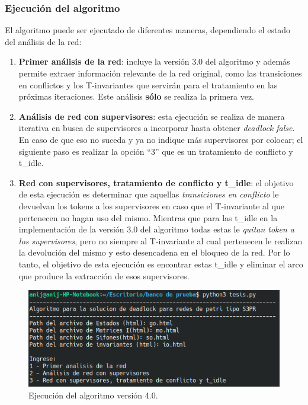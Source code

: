 \subsubsection{Ejecución del algoritmo}
\noindent El algoritmo puede ser ejecutado de diferentes maneras, dependiendo el estado del análisis de la red: 

\begin{enumerate}
    \item \textbf{Primer análisis de la red}: incluye la versión 3.0 del algoritmo y además permite extraer información relevante de la red original, como las transiciones en conflictos y los T-invariantes que servirán para el tratamiento en las próximas iteraciones. Este análisis \textbf{sólo} se realiza la primera vez.
    
    \item \textbf{Análisis de red con supervisores}: esta ejecución se realiza de manera iterativa en busca de supervisores a incorporar hasta obtener \textit{deadlock false}. En caso de que eso no suceda y ya no indique más supervisores por colocar; el siguiente paso es realizar la opción “3” que es un tratamiento de conflicto y t\_idle.
    
    \item \textbf{Red con supervisores, tratamiento de conflicto y t\_idle}: el objetivo de esta ejecución es determinar que aquellas \textit{transiciones en conflicto} le devuelvan los tokens a los supervisores en caso que el T-invariante al que pertenecen no hagan uso del mismo. Mientras que para las t\_idle en la implementación de la versión 3.0 del algoritmo todas estas le \textit{quitan token a los supervisores}, pero no siempre al T-invariante al cual pertenecen le realizan la devolución del mismo y esto desencadena en el bloqueo de la red. Por lo tanto, el objetivo de esta ejecución es encontrar estas t\_idle y eliminar el arco que produce la extracción de esos supervisores.
\end{enumerate}

\begin{figure}[H]
	\centering
	\includegraphics[width=\textwidth]{Figures/algoritmo4/terminal-ejecucion-algoritmo.png}
	\caption{Ejecución del algoritmo versión 4.0.}
	\label{fig:algoritmov4}
\end{figure}


